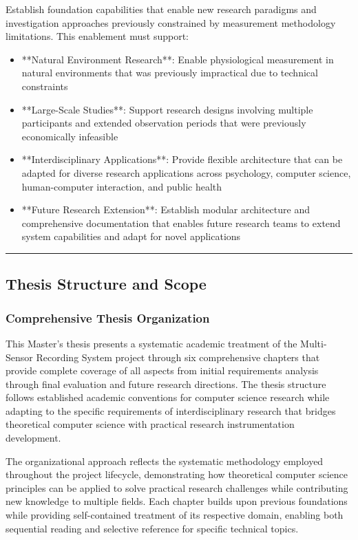 \documentclass[11pt,a4paper]{report}
\begin{document}
Establish foundation capabilities that enable new research paradigms and investigation approaches previously constrained
by measurement methodology limitations. This enablement must support:

\begin{itemize}
\item **Natural Environment Research**: Enable physiological measurement in natural environments that was previously
  impractical due to technical constraints
\item **Large-Scale Studies**: Support research designs involving multiple participants and extended observation periods
  that were previously economically infeasible
\item **Interdisciplinary Applications**: Provide flexible architecture that can be adapted for diverse research
  applications across psychology, computer science, human-computer interaction, and public health
\item **Future Research Extension**: Establish modular architecture and comprehensive documentation that enables future
  research teams to extend system capabilities and adapt for novel applications

\end{itemize}
\hrule

\subsection{Thesis Structure and Scope}

\subsubsection{Comprehensive Thesis Organization}

This Master's thesis presents a systematic academic treatment of the Multi-Sensor Recording System project through six
comprehensive chapters that provide complete coverage of all aspects from initial requirements analysis through final
evaluation and future research directions. The thesis structure follows established academic conventions for computer
science research while adapting to the specific requirements of interdisciplinary research that bridges theoretical
computer science with practical research instrumentation development.

The organizational approach reflects the systematic methodology employed throughout the project lifecycle, demonstrating
how theoretical computer science principles can be applied to solve practical research challenges while contributing new
knowledge to multiple fields. Each chapter builds upon previous foundations while providing self-contained treatment of
its respective domain, enabling both sequential reading and selective reference for specific technical topics.
\end{document}
